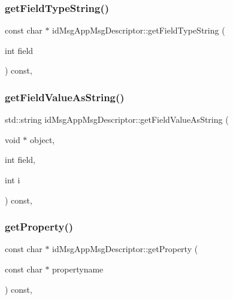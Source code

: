 \subsubsection{\texorpdfstring{get\+Field\+Type\+String()}{getFieldTypeString()}}
{\footnotesize\ttfamily const char $\ast$ id\+Msg\+App\+Msg\+Descriptor\+::get\+Field\+Type\+String (\begin{DoxyParamCaption}\item[{int}]{field }\end{DoxyParamCaption}) const\hspace{0.3cm}{\ttfamily [override]}, {\ttfamily [virtual]}}

\mbox{\label{classid_msg_app_msg_descriptor_a42e71d687276c6b4ffd5d812eb9216a3}} 
\subsubsection{\texorpdfstring{get\+Field\+Value\+As\+String()}{getFieldValueAsString()}}
{\footnotesize\ttfamily std\+::string id\+Msg\+App\+Msg\+Descriptor\+::get\+Field\+Value\+As\+String (\begin{DoxyParamCaption}\item[{void $\ast$}]{object,  }\item[{int}]{field,  }\item[{int}]{i }\end{DoxyParamCaption}) const\hspace{0.3cm}{\ttfamily [override]}, {\ttfamily [virtual]}}

\mbox{\label{classid_msg_app_msg_descriptor_ac9b9240ff817b217015861a922206080}} 
\subsubsection{\texorpdfstring{get\+Property()}{getProperty()}}
{\footnotesize\ttfamily const char $\ast$ id\+Msg\+App\+Msg\+Descriptor\+::get\+Property (\begin{DoxyParamCaption}\item[{const char $\ast$}]{propertyname }\end{DoxyParamCaption}) const\hspace{0.3cm}{\ttfamily [override]}, {\ttfamily [virtual]}}

